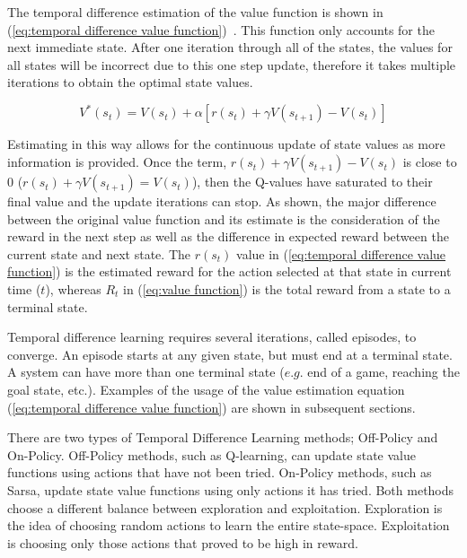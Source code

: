 \documentclass[12pt,american]{report}
\begin{document}
The temporal difference estimation of the value function is shown in (\ref{eq:temporal difference value function})~\cite{Eden}. This function only accounts for the next immediate state.  After one iteration through all of the states, the values for all states will be incorrect due to this one step update, therefore it takes multiple iterations to obtain the optimal state values.
               
        \begin{equation}
            \label{eq:temporal difference value function}
            V^*(s_{t}) = V(s_{t}) + \alpha[r(s_{t}) + \gamma V(s_{t+1})-V(s_{t})]
        \end{equation}
        
        Estimating in this way allows for the continuous update of state values as more information is provided.  Once the term, $r(s_{t}) + \gamma V(s_{t+1})-V(s_{t})$ is close to $0$ ($r(s_{t}) + \gamma V(s_{t+1}) = V(s_{t})$), then the Q-values have saturated to their final value and the update iterations can stop.  As shown, the major difference between the original value function and its estimate is the consideration of the reward in the next step as well as the difference in expected reward between the current state and next state. The \textit{$r(s_t)$} value in (\ref{eq:temporal difference value function}) is the estimated reward for the action selected at that state in current time ($t$), whereas \textit{$R_t$} in (\ref{eq:value function}) is the total reward from a state to a terminal state. 

Temporal difference learning requires several iterations, called episodes, to converge. An episode starts at any given state, but must end at a terminal state.  A system can have more than one terminal state ($e.g.$ end of a game, reaching the goal state, etc.). Examples of the usage of the value estimation equation (\ref{eq:temporal difference value function}) are shown in subsequent sections.

There are two types of Temporal Difference Learning methods; Off-Policy and On-Policy. Off-Policy methods, such as Q-learning, can update state value functions using actions that have not been tried. On-Policy methods, such as Sarsa, update state value functions using only actions it has tried.  Both methods choose a different balance between exploration and exploitation.  Exploration is the idea of choosing random actions to learn the entire state-space.  Exploitation is choosing only those actions that proved to be high in reward.
        
\end{document}
